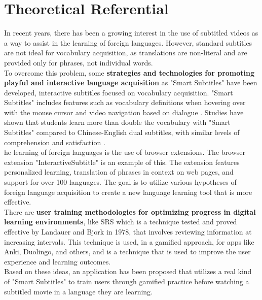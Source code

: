 \documentclass[12pt]{article}
\begin{document}
\section{Theoretical Referential}
In recent years, there has been a growing interest in the use of subtitled videos as a way to assist in the learning of foreign languages. However, standard subtitles are not ideal for vocabulary acquisition, as translations are non-literal and are provided only for phrases, not individual words. \\
To overcome this problem, some \textbf{strategies and technologies for promoting playful and interactive language
acquisition} as "Smart Subtitles" have been developed, interactive subtitles focused on vocabulary acquisition. "Smart Subtitles" includes features such as vocabulary definitions when hovering over with the mouse cursor and video navigation based on dialogue \cite{Kovacs13}. Studies have shown that students learn more than double the vocabulary with "Smart Subtitles" compared to Chinese-English dual subtitles, with similar levels of comprehension and satisfaction \cite{Kovacs14}. \\ he learning of foreign languages is the use of browser extensions. The browser extension "InteractiveSubtitle" \cite{ElBatanony21} is an example of this. The extension features personalized learning, translation of phrases in context on web pages, and support for over 100 languages. The goal is to utilize various hypotheses of foreign language acquisition to create a new language learning tool that is more effective. \\ 
There are \textbf{user training methodologies for optimizing progress in digital learning environments}, like SRS which is a technique tested and proved effective by Landauer and Bjork in 1978, that involves reviewing information at increasing intervals. This technique is used, in a gamified approach, for apps like Anki, Duolingo, and others, and is a technique that is used to improve the user experience and learning outcomes. \\
Based on these ideas, an application has been proposed that utilizes a real kind of "Smart Subtitles" to train users through gamified practice before watching a subtitled movie in a language they are learning.   \\
\end{document}
